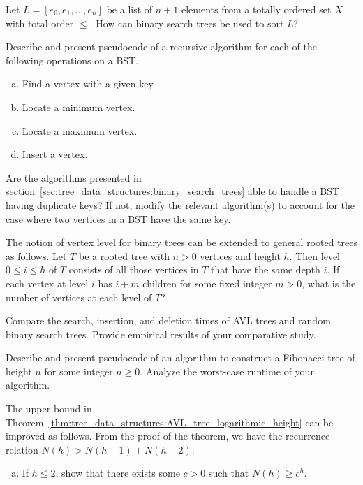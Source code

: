 \begin{problem}
\item Let $L = [e_0, e_1, \dots, e_n]$ be a list of $n + 1$ elements
  from a totally ordered set $X$ with total order $\leq$. How can
  binary search trees be used to sort $L$?

\item Describe and present pseudocode of a recursive algorithm for
  each of the following operations on a BST.
  \begin{enumerate}[(a)]
  \item Find a vertex with a given key.

  \item Locate a minimum vertex.

  \item Locate a maximum vertex.

  \item Insert a vertex.
  \end{enumerate}

\item Are the algorithms presented in
  section~\ref{sec:tree_data_structures:binary_search_trees} able to
  handle a BST having duplicate keys? If not, modify the relevant
  algorithm(s) to account for the case where two vertices in a BST
  have the same key.

\item The notion of vertex level for binary trees can be extended to
  general rooted trees as follows. Let $T$ be a rooted tree with
  $n > 0$ vertices and height $h$. Then level
  $0 \leq i \leq h$ of $T$ consists of all those vertices in $T$ that
  have the same depth $i$. If each vertex at level $i$ has $i + m$
  children for some fixed integer $m > 0$, what is the number of
  vertices at each level of $T$?

\item Compare the search, insertion, and deletion times of AVL trees
  and random binary search trees. Provide empirical results of your
  comparative study.

\item Describe and present pseudocode of an algorithm to construct a
  Fibonacci tree of height $n$ for some integer
  $n \geq 0$. Analyze the worst-case runtime of your algorithm.

\item The upper bound in
  Theorem~\ref{thm:tree_data_structures:AVL_tree_logarithmic_height}
  can be improved as follows. From the proof of the theorem, we have
  the recurrence relation
  $N(h) > N(h - 1) + N(h - 2)$.
  \begin{enumerate}[(a)]
  \item If $h \leq 2$, show that there exists some $c > 0$ such that
    $N(h) \geq c^h$.


\end{enumerate}
\end{problem}
